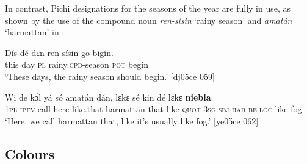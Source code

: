 \ea%
    \label{ex:key:1748}
\z\z

In contrast, Pichi designations for the seasons of the year are fully in use, as shown by the use of the compound noun \textit{ren-sísin} ‘rainy season’  and \textit{amatán} ‘harmattan’ in :


\ea%
    \label{ex:key:1749}
    \gll Dís  dé  dɛn  ren-sísin    go  bigín.\\
this  day  \textsc{pl}  rainy.\textsc{cpd}{}-season  \textsc{pot}  begin\\

\glt ‘These days, the rainy season should begin.’ [dj05ce 059]
\z


\ea
\label{ex:key:1750}
\gll
  Wi  de  kɔ́l  yá    só    amatán    dán,    lɛkɛ  sé
 kin  dé    lɛkɛ  \textbf{niebla}.\\
\textsc{1pl}  \textsc{ipfv}  call  here    like.that  harmattan  that    like  \textsc{quot}
\textsc{3sg.sbj}  \textsc{hab}  \textsc{be.loc}  like  fog \\
\glt ‘Here, we call harmattan that, like it’s usually like fog.’ [ye05ce 062]
\z

\subsection{Colours}

